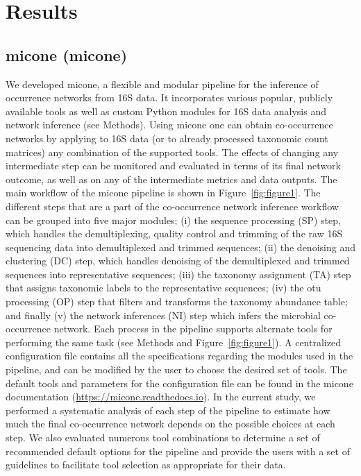 
\section*{Results}

  \subsection*{\acl{micone} (\acs{micone})}

  We developed \ac{micone}, a flexible and modular pipeline for the inference of occurrence networks from 16S data.
  It incorporates various popular, publicly available tools as well as custom Python modules for 16S data analysis and network inference (see Methods).
  Using \ac{micone} one can obtain co-occurrence networks by applying to 16S data (or to already processed taxonomic count matrices) any combination of the supported tools.
  The effects of changing any intermediate step can be monitored and evaluated in terms of its final network outcome, as well as on any of the intermediate metrics and data outputs.
  The main workflow of the \ac{micone} pipeline is shown in Figure~\ref{fig:figure1}.
  The different steps that are a part of the co-occurrence network inference workflow can be grouped into five major modules; (i) the sequence processing (SP) step, which handles the demultiplexing, quality control and trimming of the raw 16S sequencing data into demultiplexed and trimmed sequences; (ii) the denoising and clustering (DC) step, which handles denoising of the demultiplexed and trimmed sequences into representative sequences; (iii) the taxonomy assignment (TA) step that assigns taxonomic labels to the representative sequences; (iv) the \ac{otu} processing (OP) step that filters and transforms the taxonomy abundance table; and finally (v) the network inferences (NI) step which infers the microbial co-occurrence network.
  Each process in the pipeline supports alternate tools for performing the same task (see Methods and Figure~\ref{fig:figure1}).
  A centralized configuration file contains all the specifications regarding the modules used in the pipeline, and can be modified by the user to choose the desired set of tools.
  The default tools and parameters for the configuration file can be found in the \ac{micone} documentation (\href{https://micone.readthedocs.io}{https://micone.readthedocs.io}).
  In the current study, we performed a systematic analysis of each step of the pipeline to estimate how much the final co-occurrence network depends on the possible choices at each step.
  We also evaluated numerous tool combinations to determine a set of recommended default options for the pipeline and provide the users with a set of guidelines to facilitate tool selection as appropriate for their data.

